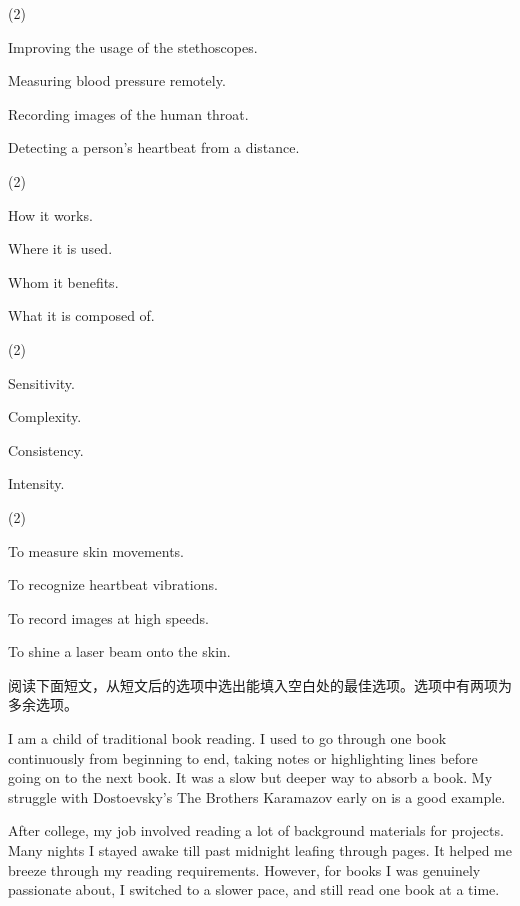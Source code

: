 \documentclass{英语试卷}
\begin{document}
\begin{choices}(2)
  \item Improving the usage of the stethoscopes.
  \item Measuring blood pressure remotely.
  \item Recording images of the human throat.
  \item Detecting a person's heartbeat from a distance.
\end{choices}
\begin{choices}(2)
  \item How it works.
  \item Where it is used.
  \item Whom it benefits.
  \item What it is composed of.
\end{choices}
\begin{choices}(2)
  \item Sensitivity.
  \item Complexity.
  \item Consistency.
  \item Intensity.
\end{choices}
\begin{choices}(2)
  \item To measure skin movements.
  \item To recognize heartbeat vibrations.
  \item To record images at high speeds.
  \item To shine a laser beam onto the skin.
\end{choices}
\par 阅读下面短文，从短文后的选项中选出能填入空白处的最佳选项。选项中有两项为多余选项。\par
\par I am a child of traditional book reading. I used to go through one book continuously from beginning to end, taking notes or highlighting lines before going on to the next book. It was a slow but deeper way to absorb a book.  My struggle with Dostoevsky's The Brothers Karamazov early on is a good example.\par
\par After college, my job involved reading a lot of background materials for projects. Many nights I stayed awake till past midnight leafing through pages.  It helped me breeze through my reading requirements. However, for books I was genuinely passionate about, I switched to a slower pace, and still read one book at a time.\par
\end{document}
